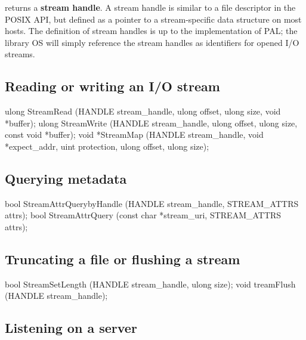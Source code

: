 returns a {\bf stream handle}. A stream handle is similar to a file descriptor in the POSIX API,
but defined as a pointer to a stream-specific data structure on most hosts.
The definition of stream handles is up to the implementation of PAL;
the library OS will simply reference the stream handles as identifiers for opened I/O streams.




\subsection*{Reading or writing an I/O stream}



\begin{paldef}
ulong StreamRead  (HANDLE stream_handle, ulong offset,
                   ulong size, void *buffer);
ulong StreamWrite (HANDLE stream_handle, ulong offset,
                   ulong size, const void *buffer);
void *StreamMap   (HANDLE stream_handle,
                   void *expect_addr, uint protection,
                   ulong offset, ulong size);
\end{paldef}



\subsection*{Querying metadata}

\begin{paldef}
bool StreamAttrQuerybyHandle (HANDLE stream_handle,
                              STREAM_ATTRS attrs);
bool StreamAttrQuery (const char *stream_uri,
                      STREAM_ATTRS attrs);

\end{paldef}



\subsection*{Truncating a file or flushing a stream}


\begin{paldef}
bool StreamSetLength (HANDLE stream_handle, ulong size);
void treamFlush (HANDLE stream_handle);
\end{paldef}


\subsection*{Listening on a server}


